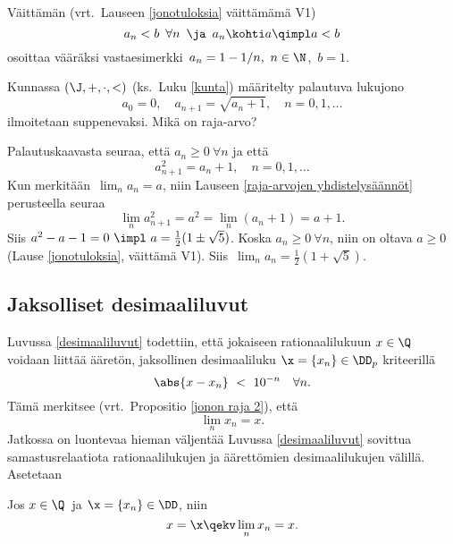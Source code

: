 \begin{Exa} Väittämän (vrt.\ Lauseen \ref{jonotuloksia} väittämämä V1) 
\[
a_n < b\,\ \forall n\,\ \ja\,\ a_n \kohti a \qimpl a<b
\]
osoittaa vääräksi vastaesimerkki $\,a_n=1-1/n,\ n\in\N$, $\,b=1$. \loppu
\end{Exa}
\begin{Exa} Kunnassa $(\J,+,\cdot,<)$ (ks.\ Luku \ref{kunta}) määritelty palautuva lukujono
\[
a_0=0, \quad a_{n+1}=\sqrt{a_n + 1}, \quad n=0,1,\ldots
\]
ilmoitetaan suppenevaksi. Mikä on raja-arvo?
\end{Exa}
\ratk Palautuskaavasta seuraa, että $a_n \ge 0\ \forall n$ ja että
\[
a_{n+1}^2 = a_n + 1, \quad n=0,1,\ldots
\]
Kun merkitään $\,\lim_n a_n=a$, niin Lauseen \ref{raja-arvojen yhdistelysäännöt} perusteella
seuraa
\[
\lim_n a_{n+1}^2 = a^2 = \lim_n(a_n + 1) = a+1.
\]
Siis $a^2-a-1=0\ \impl\ a=\tfrac{1}{2}(1\pm\sqrt{5})$. Koska $a_n \ge 0\ \forall n$, niin
on oltava $a \ge 0$ (Lause \ref{jonotuloksia}, väittämä V1). Siis 
$\,\lim_n a_n =\tfrac{1}{2}(1+\sqrt{5})$. \loppu

\subsection{Jaksolliset desimaaliluvut}
%

Luvussa \ref{desimaaliluvut} todettiin, että jokaiseen rationaalilukuun $x \in \Q$ voidaan
liittää ääretön, jaksollinen desimaaliluku $\x = \{x_n\} \in \DD_p$ kriteerillä
\[
\abs{x - x_n}\ <\ 10^{-n} \quad \forall n.
\]
Tämä merkitsee (vrt.\ Propositio \ref{jonon raja 2}), että
\[
\lim_n x_n = x.
\]
Jatkossa on luontevaa hieman väljentää Luvussa \ref{desimaaliluvut} sovittua samastusrelaatiota
rationaalilukujen ja äärettömien desimaalilukujen välillä. Asetetaan

\begin{Def} \label{samastus QD} Jos $x\in\Q\,$ ja $\x = \{x_n\} \in \DD$, niin
\[
x=\x \qekv \lim_n x_n = x.
\] 
\end{Def}

